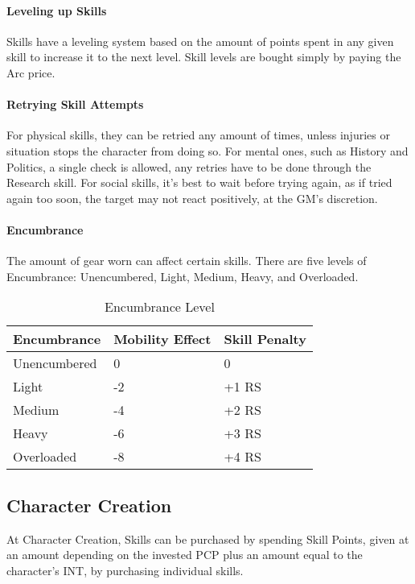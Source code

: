 \documentclass[oneside,11pt,english]{book}
\begin{document}
\paragraph{Leveling up Skills} Skills have a leveling system based on the amount of points spent in any given skill to increase it to the next level. Skill levels are bought simply by paying the Arc price.
\paragraph{Retrying Skill Attempts} For physical skills, they can be retried any amount of times, unless injuries or situation stops the character from doing so. For mental ones, such as History and Politics, a single check is allowed, any retries have to be done through the Research skill. For social skills, it’s best to wait before trying again, as if tried again too soon, the target may not react positively, at the GM’s discretion.
\paragraph{Encumbrance} The amount of gear worn can affect certain skills. There are five levels of Encumbrance: Unencumbered, Light, Medium, Heavy, and Overloaded.\\
\begin{wraptable}{r}{10 cm}%
	\centering
	\begin{tabu} spread 0pt{XX[c]X[r]}
Encumbrance		&Mobility Effect&Skill Penalty\\\toprule
Unencumbered	&0				&0\\
Light			&-2				&+1 RS\\
Medium			&-4				&+2 RS\\
Heavy			&-6				&+3 RS\\
Overloaded		&-8				&+4 RS\\
	\end{tabu}
	\caption{Encumbrance Level}
	\label{tab:Encumbrance Penalties}
\end{wraptable}


\subsection{Character Creation}
At Character Creation, Skills can be purchased by spending Skill Points, given at an amount depending on the invested PCP plus an amount equal to the character’s INT, by purchasing individual skills.
\end{document}
